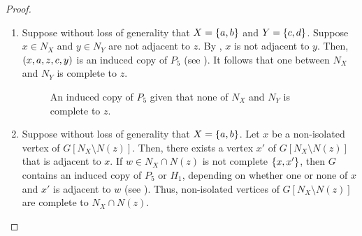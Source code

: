 \begin{proof}
    \leavevmode \par
    \begin{enumerate}[label=(\roman*)]
        \item Suppose without loss of generality that $X=\left\{a,b\right\}$ and
            $Y=\left\{c,d\right\}$. Suppose $x\in N_X$ and $y\in N_Y$ are not adjacent to
            $z$. By , $x$ is not adjacent to $y$. Then,
            $\left(x,a,z,c,y\right)$ is an induced copy of $P_5$ (see
            ). It follows that one between $N_X$ and
            $N_Y$ is complete to $z$.

            \begin{figure}[htb!]
                \centering
                \caption{An induced copy of $P_5$ given that none of $N_X$ and
                    $N_Y$ is complete to $z$.}
                \label{fig:chordal_comp_1}
            \end{figure}

        \item Suppose without loss of generality that $X=\left\{a,b\right\}$. Let $x$ be a
            non-isolated vertex of $G[N_X\setminus N(z)]$. Then, there exists a
            vertex $x'$ of $G[N_X\setminus N(z)]$ that is adjacent to $x$. If
            $w\in N_X\cap N(z)$ is not complete $\left\{x,x'\right\}$, then $G$ contains an
            induced copy of $P_5$ or $H_1$, depending on whether one or none of
            $x$ and $x'$ is adjacent to $w$ (see ).
            Thus, non-isolated vertices of $G[N_X\setminus N(z)]$ are complete
            to $N_X\cap N(z)$.


\end{enumerate}
\end{proof}
